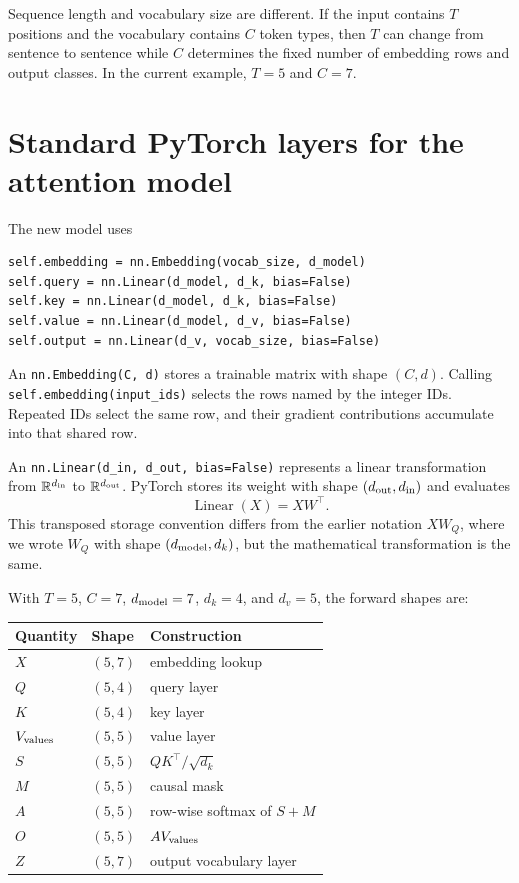 \documentclass[11pt]{article}
\newcommand{\R}{\mathbb{R}}
\begin{document}
Sequence length and vocabulary size are different. If the input contains $T$ positions and the vocabulary
contains $C$ token types, then $T$ can change from sentence to sentence while $C$ determines the fixed number
of embedding rows and output classes. In the current example, $T=5$ and $C=7$.

\section{Standard PyTorch layers for the attention model}

The new model uses
\begin{lstlisting}
self.embedding = nn.Embedding(vocab_size, d_model)
self.query = nn.Linear(d_model, d_k, bias=False)
self.key = nn.Linear(d_model, d_k, bias=False)
self.value = nn.Linear(d_model, d_v, bias=False)
self.output = nn.Linear(d_v, vocab_size, bias=False)
\end{lstlisting}
An \texttt{nn.Embedding(C, d)} stores a trainable matrix with shape $(C,d)$. Calling
\texttt{self.embedding(input\_ids)} selects the rows named by the integer IDs. Repeated IDs select the same
row, and their gradient contributions accumulate into that shared row.

An \texttt{nn.Linear(d\_in, d\_out, bias=False)} represents a linear transformation from
$\R^{d_{\rm in}}$ to $\R^{d_{\rm out}}$. PyTorch stores its weight with shape
$(d_{\rm out},d_{\rm in})$ and evaluates
\[
  \operatorname{Linear}(X)=XW^\top.
\]
This transposed storage convention differs from the earlier notation $XW_Q$, where we wrote $W_Q$ with shape
$(d_{\rm model},d_k)$, but the mathematical transformation is the same.

With $T=5$, $C=7$, $d_{\rm model}=7$, $d_k=4$, and $d_v=5$, the forward shapes are:
\begin{center}
\begin{tabular}{lll}
\toprule
Quantity & Shape & Construction\\
\midrule
$X$ & $(5,7)$ & embedding lookup\\
$Q$ & $(5,4)$ & query layer\\
$K$ & $(5,4)$ & key layer\\
$V_{\rm values}$ & $(5,5)$ & value layer\\
$S$ & $(5,5)$ & $QK^\top/\sqrt{d_k}$\\
$M$ & $(5,5)$ & causal mask\\
$A$ & $(5,5)$ & row-wise softmax of $S+M$\\
$O$ & $(5,5)$ & $AV_{\rm values}$\\
$Z$ & $(5,7)$ & output vocabulary layer\\
\bottomrule
\end{tabular}
\end{center}
\end{document}
